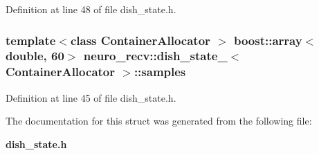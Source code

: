 \-Definition at line 48 of file dish\-\_\-state.\-h.

\subsubsection[{samples}]{\setlength{\rightskip}{0pt plus 5cm}template$<$class Container\-Allocator $>$ boost\-::array$<$double, 60$>$ {\bf neuro\-\_\-recv\-::dish\-\_\-state\-\_\-}$<$ \-Container\-Allocator $>$\-::{\bf samples}}\label{structneuro__recv_1_1dish__state___a2aba4f9e058937f492f1901dcce90c10}


\-Definition at line 45 of file dish\-\_\-state.\-h.



\-The documentation for this struct was generated from the following file\-:\begin{DoxyCompactItemize}
\item 
{\bf dish\-\_\-state.\-h}\end{DoxyCompactItemize}
